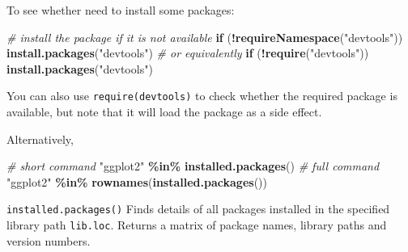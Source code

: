 \documentclass[
  a4paper,
  twoside,
  openright]{book}
\newenvironment{Shaded}{\begin{snugshade}}{\end{snugshade}}
\newcommand{\CommentTok}[1]{\textcolor[rgb]{0.56,0.35,0.01}{\textit{#1}}}
\newcommand{\ControlFlowTok}[1]{\textcolor[rgb]{0.13,0.29,0.53}{\textbf{#1}}}
\newcommand{\FunctionTok}[1]{\textcolor[rgb]{0.13,0.29,0.53}{\textbf{#1}}}
\newcommand{\NormalTok}[1]{#1}
\newcommand{\SpecialCharTok}[1]{\textcolor[rgb]{0.81,0.36,0.00}{\textbf{#1}}}
\newcommand{\StringTok}[1]{\textcolor[rgb]{0.31,0.60,0.02}{#1}}
\theoremstyle{definition}
\theoremstyle{definition}
\theoremstyle{definition}
\theoremstyle{definition}
\theoremstyle{remark}
\begin{document}
To see whether need to install some packages:

\begin{Shaded}
\begin{Highlighting}[]
\CommentTok{\# install the package if it is not available}
\ControlFlowTok{if}\NormalTok{ (}\SpecialCharTok{!}\FunctionTok{requireNamespace}\NormalTok{(}\StringTok{"devtools"}\NormalTok{)) }\FunctionTok{install.packages}\NormalTok{(}\StringTok{"devtools"}\NormalTok{)}
\CommentTok{\# or equivalently}
\ControlFlowTok{if}\NormalTok{ (}\SpecialCharTok{!}\FunctionTok{require}\NormalTok{(}\StringTok{"devtools"}\NormalTok{)) }\FunctionTok{install.packages}\NormalTok{(}\StringTok{"devtools"}\NormalTok{)}
\end{Highlighting}
\end{Shaded}

You can also use \texttt{require(devtools)} to check whether the required package is available, but note that it will load the package as a side effect.

Alternatively,

\begin{Shaded}
\begin{Highlighting}[]
\CommentTok{\# short command}
\StringTok{"ggplot2"} \SpecialCharTok{\%in\%} \FunctionTok{installed.packages}\NormalTok{()}
\CommentTok{\# full command}
\StringTok{"ggplot2"} \SpecialCharTok{\%in\%} \FunctionTok{rownames}\NormalTok{(}\FunctionTok{installed.packages}\NormalTok{())}
\end{Highlighting}
\end{Shaded}

\texttt{installed.packages()} Finds details of all packages installed in the specified library path \texttt{lib.loc}. Returns a matrix of package names, library paths and version numbers.
\end{document}
